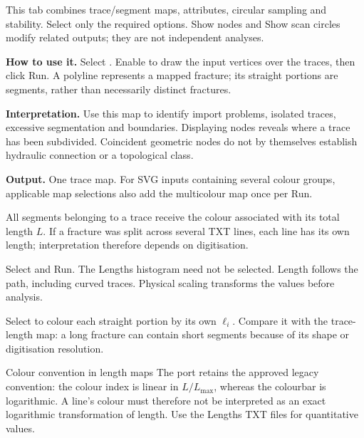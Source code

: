 \label{sec:maps}
This tab combines trace/segment maps, attributes, circular sampling and stability. Select only the required options. Show nodes and Show scan circles modify related outputs; they are not independent analyses.

\textbf{How to use it.} Select . Enable  to draw the input vertices over the traces, then click Run. A polyline represents a mapped fracture; its straight portions are segments, rather than necessarily distinct fractures.

\textbf{Interpretation.} Use this map to identify import problems, isolated traces, excessive segmentation and boundaries. Displaying nodes reveals where a trace has been subdivided. Coincident geometric nodes do not by themselves establish hydraulic connection or a topological class.

\textbf{Output.} One trace map. For SVG inputs containing several colour groups, applicable map selections also add the multicolour map once per Run.

All segments belonging to a trace receive the colour associated with its total length \(L\). If a fracture was split across several TXT lines, each line has its own length; interpretation therefore depends on digitisation.

Select  and Run. The Lengths histogram need not be selected. Length follows the path, including curved traces. Physical scaling transforms the values before analysis.

Select  to colour each straight portion by its own \(\ell_i\). Compare it with the trace-length map: a long fracture can contain short segments because of its shape or digitisation resolution.

\begin{note}{Colour convention in length maps}
The port retains the approved legacy convention: the colour index is linear in \(L/L_{\max}\), whereas the colourbar is logarithmic. A line's colour must therefore not be interpreted as an exact logarithmic transformation of length. Use the Lengths TXT files for quantitative values.
\end{note}

